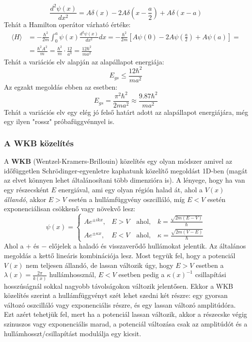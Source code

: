 \documentclass[../main.tex]{subfiles}
\begin{document}
\begin{equation}
    \frac{d^2 \psi(x)}{dx^2} = A \delta(x) - 2A \delta\left(x - \frac{a}{2}\right) + A \delta(x - a)
\end{equation}
Tehát a Hamilton operátor várható értéke:
\begin{equation}
    \begin{aligned}
        \langle H \rangle &= -\frac{\hbar^2}{2m} \int_0^a \psi(x) \frac{d^2 \psi(x)}{dx^2} dx = -\frac{\hbar^2}{2m} \left[ A \psi(0) - 2A \psi\left(\frac{a}{2}\right) + A \psi(a) \right] = \\
        &= \frac{\hbar^2 A^2}{m} = \frac{\hbar^2}{m} \cdot \frac{12}{a^3} = \frac{12 \hbar^2}{m a^2}
    \end{aligned}
\end{equation}
Tehát a variációs elv alapján az alapállapot energiája:
\begin{equation}
    E_{gs} \leq \frac{12 \hbar^2}{m a^2}
\end{equation}
Az egzakt megoldás ebben az esetben:
\begin{equation}
    E_{gs} = \frac{\pi^2 \hbar^2}{2 m a^2} \approx \frac{9.87 \hbar^2}{m a^2}
\end{equation}
Tehát a variációs elv egy elég jó felső határt adott az alapállapot energiájára, még egy ilyen "rossz" próbafüggvénnyel is.

\subsubsection{A WKB közelítés}
A \textbf{WKB} (Wentzel-Kramers-Brillouin) közelítés egy olyan módszer amivel az időfüggetlen Schrödinger-egyenletre kaphatunk közelítő megoldást 1D-ben (magát az elvet könnyen lehet általánosítani több dimenzióra is).
A lényege, hogy ha van egy részecsként $E$ energiával, ami egy olyan régión halad át, ahol a $V(x)$ \textit{állandó}, akkor $E > V$ esetén a hullámfüggvény oszcilláló, míg $E < V$ esetén exponenciálisan csökkenő vagy növekvő lesz:
\begin{equation}
    \psi(x) = \begin{cases}
        A e^{\pm i k x}, & E > V \quad \text{ahol,} \quad k = \frac{\sqrt{2m (E - V)}}{\hbar}\\
        A e^{\pm \kappa x}, & E < V \quad \text{ahol,} \quad \kappa = \frac{\sqrt{2m (V - E)}}{\hbar}
    \end{cases}
\end{equation}
Ahol a $+$ és $-$ előjelek a haladó és visszaverődő hullámokat jelentik. Az általános megoldás a kettő lineáris kombinációja lesz. Most tegyük fel, hogy a potenciál $V(x)$ nem teljesen állandó, de lassan változik úgy,
hogy $E > V$ esetben a $\lambda(x) = \frac{2 \pi}{k(x)}$ hullámhossznál, $E < V$ esetben pedig a $\kappa(x)^{-1}$ csillapítási hosszúságnál sokkal nagyobb távolságokon változik jelentősen. Ekkor a WKB közelítés szerint a hullámfüggvényt
szét lehet szedni két részre: egy gyorsan változó oszcilláló vagy exponenciális részre, és egy lassan változó amplitúdóra. Ezt azért tehetjük fel, mert ha a potenciál lassan változik, akkor a részecske végig szinuszos vagy exponenciális marad,
a potenciál változása csak az amplitúdót és a hullámhosszt/csillapítást modulálja egy kicsit.
\end{document}
